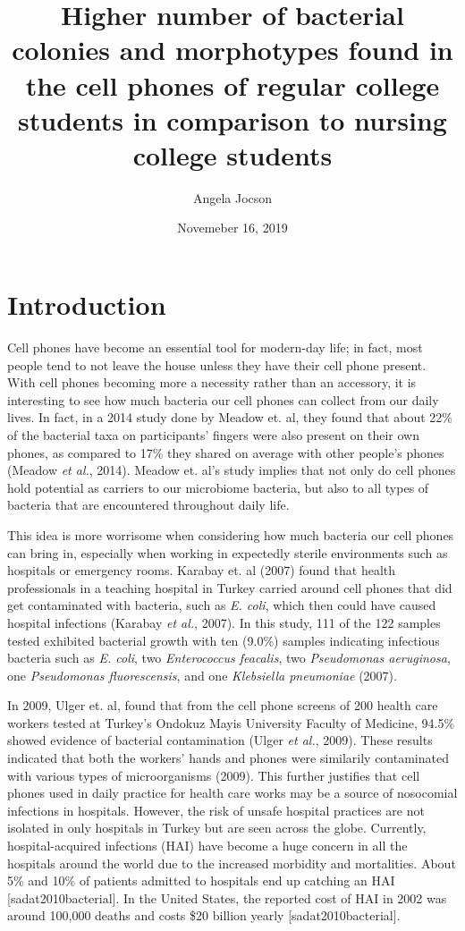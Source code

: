 \documentclass[]{article}
\title{Higher number of bacterial colonies and morphotypes found in the cell
phones of regular college students in comparison to nursing college
students}
\author{Angela Jocson}
\date{Novemeber 16, 2019}
\begin{document}
\maketitle

\hypertarget{introduction}{%
\section{Introduction}\label{introduction}}

Cell phones have become an essential tool for modern-day life; in fact,
most people tend to not leave the house unless they have their cell
phone present. With cell phones becoming more a necessity rather than an
accessory, it is interesting to see how much bacteria our cell phones
can collect from our daily lives. In fact, in a 2014 study done by
Meadow et. al, they found that about 22\% of the bacterial taxa on
participants' fingers were also present on their own phones, as compared
to 17\% they shared on average with other people's phones (Meadow
\emph{et al.}, 2014). Meadow et. al's study implies that not only do
cell phones hold potential as carriers to our microbiome bacteria, but
also to all types of bacteria that are encountered throughout daily
life.

This idea is more worrisome when considering how much bacteria our cell
phones can bring in, especially when working in expectedly sterile
environments such as hospitals or emergency rooms. Karabay et. al (2007)
found that health professionals in a teaching hospital in Turkey carried
around cell phones that did get contaminated with bacteria, such as
\emph{E. coli}, which then could have caused hospital infections
(Karabay \emph{et al.}, 2007). In this study, 111 of the 122 samples
tested exhibited bacterial growth with ten (9.0\%) samples indicating
infectious bacteria such as \emph{E. coli}, two \emph{Enterococcus
feacalis}, two \emph{Pseudomonas aeruginosa}, one \emph{Pseudomonas
fluorescensis}, and one \emph{Klebsiella pneumoniae} (2007).

In 2009, Ulger et. al, found that from the cell phone screens of 200
health care workers tested at Turkey's Ondokuz Mayis University Faculty
of Medicine, 94.5\% showed evidence of bacterial contamination (Ulger
\emph{et al.}, 2009). These results indicated that both the workers'
hands and phones were similarily contaminated with various types of
microorganisms (2009). This further justifies that cell phones used in
daily practice for health care works may be a source of nosocomial
infections in hospitals. However, the risk of unsafe hospital practices
are not isolated in only hospitals in Turkey but are seen across the
globe. Currently, hospital-acquired infections (HAI) have become a huge
concern in all the hospitals around the world due to the increased
morbidity and mortalities. About 5\% and 10\% of patients admitted to
hospitals end up catching an HAI {[}sadat2010bacterial{]}. In the United
States, the reported cost of HAI in 2002 was around 100,000 deaths and
costs \$20 billion yearly {[}sadat2010bacterial{]}.
\end{document}
